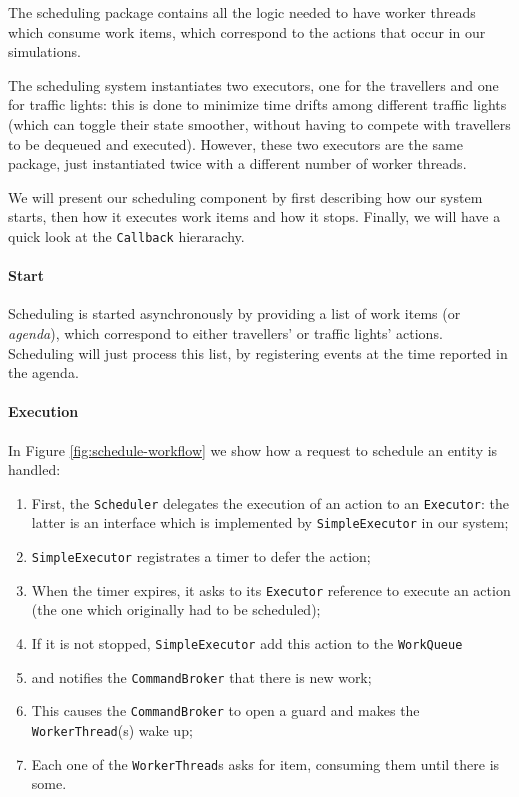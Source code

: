 The scheduling package contains all the logic needed to have worker threads
which consume work items, which correspond to the actions that occur in our
simulations.

The scheduling system instantiates two executors, one for the travellers and
one for traffic lights: this is done to minimize time drifts among different
traffic lights (which can toggle their state smoother, without having to
compete with travellers to be dequeued and executed).
However, these two executors are the same package, just instantiated twice with
a different number of worker threads.

We will present our scheduling component by first describing how our system
starts, then how it executes work items and how it stops.
Finally, we will have a quick look at the \texttt{Callback} hierarachy.

\paragraph{Start}

Scheduling is started asynchronously by providing a list of work items
(or \textit{agenda}), which correspond to either travellers' or traffic
lights' actions.
Scheduling will just process this list, by registering events at the time
reported in the agenda.

\paragraph{Execution}

In Figure \ref{fig:schedule-workflow} we show how a request to schedule an
entity is handled:

\begin{enumerate}
  \item First, the \texttt{Scheduler} delegates the execution of an action to an
    \texttt{Executor}: the latter is an interface which is implemented by
    \texttt{SimpleExecutor} in our system;
  \item \texttt{SimpleExecutor} registrates a timer to defer the action;
  \item When the timer expires, it asks to its \texttt{Executor} reference to
    execute an action (the one which originally had to be scheduled);
  \item If it is not stopped, \texttt{SimpleExecutor} add this action to the
    \texttt{WorkQueue}
  \item and notifies the \texttt{CommandBroker} that there is new work;
  \item This causes the \texttt{CommandBroker} to open a guard and makes the
    \texttt{WorkerThread}(s) wake up;
  \item Each one of the \texttt{WorkerThread}s asks for item, consuming them
    until there is some.
\end{enumerate}

